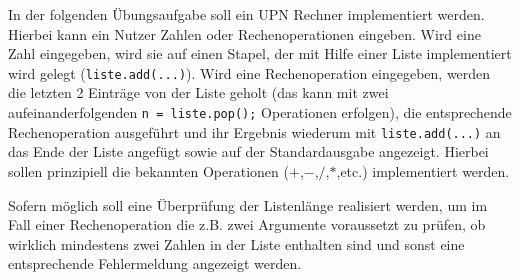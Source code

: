 
In der folgenden Übungsaufgabe soll ein UPN Rechner implementiert werden.
Hierbei kann ein Nutzer Zahlen oder Rechenoperationen eingeben. Wird eine
Zahl eingegeben, wird sie auf einen Stapel, der mit Hilfe einer Liste
implementiert wird gelegt (\texttt{liste.add(...)}). Wird eine Rechenoperation eingegeben,
werden die letzten 2 Einträge von der Liste geholt (das kann mit zwei
aufeinanderfolgenden \texttt{n = liste.pop();} Operationen erfolgen), die entsprechende
Rechenoperation ausgeführt und ihr Ergebnis wiederum mit \texttt{liste.add(...)} an das
Ende der Liste angefügt sowie auf der Standardausgabe angezeigt. Hierbei sollen
prinzipiell die bekannten Operationen ($+$,$-$,$/$,$*$,etc.) implementiert werden.

Sofern möglich soll eine Überprüfung der Listenlänge realisiert werden, um im
Fall einer Rechenoperation die z.B. zwei Argumente voraussetzt zu prüfen, ob
wirklich mindestens zwei Zahlen in der Liste enthalten sind und sonst
eine entsprechende Fehlermeldung angezeigt werden.
